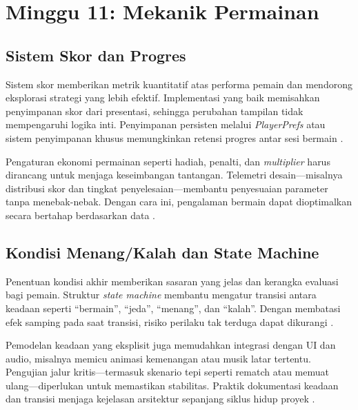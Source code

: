 \documentclass[../main.tex]{subfiles}
\begin{document}
\chapter{Minggu 11: Mekanik Permainan}

\section{Sistem Skor dan Progres}
Sistem skor memberikan metrik kuantitatif atas performa pemain dan mendorong eksplorasi strategi yang lebih efektif. Implementasi yang baik memisahkan penyimpanan skor dari presentasi, sehingga perubahan tampilan tidak mempengaruhi logika inti. Penyimpanan persisten melalui \textit{PlayerPrefs} atau sistem penyimpanan khusus memungkinkan retensi progres antar sesi bermain \parencite{unity-manual-overview}.

Pengaturan ekonomi permainan seperti hadiah, penalti, dan \textit{multiplier} harus dirancang untuk menjaga keseimbangan tantangan. Telemetri desain—misalnya distribusi skor dan tingkat penyelesaian—membantu penyesuaian parameter tanpa menebak-nebak. Dengan cara ini, pengalaman bermain dapat dioptimalkan secara bertahap berdasarkan data \parencite{gpp-nystrom}.

\section{Kondisi Menang/Kalah dan State Machine}
Penentuan kondisi akhir memberikan sasaran yang jelas dan kerangka evaluasi bagi pemain. Struktur \textit{state machine} membantu mengatur transisi antara keadaan seperti \enquote{bermain}, \enquote{jeda}, \enquote{menang}, dan \enquote{kalah}. Dengan membatasi efek samping pada saat transisi, risiko perilaku tak terduga dapat dikurangi \parencite{unity-state-machines}.

Pemodelan keadaan yang eksplisit juga memudahkan integrasi dengan UI dan audio, misalnya memicu animasi kemenangan atau musik latar tertentu. Pengujian jalur kritis—termasuk skenario tepi seperti rematch atau memuat ulang—diperlukan untuk memastikan stabilitas. Praktik dokumentasi keadaan dan transisi menjaga kejelasan arsitektur sepanjang siklus hidup proyek \parencite{unity-state-machines,gpp-nystrom}.

\onlyinsubfile{\printbibliography}
\end{document}
